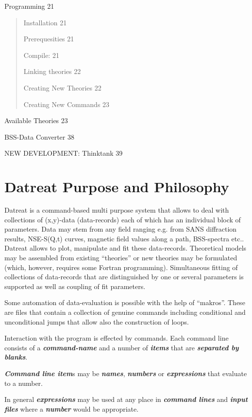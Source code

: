 \documentclass[]{article}
\begin{document}
Programming 21

\begin{quote}
Installation 21

Prerequesities 21

Compile: 21

Linking theories 22

Creating New Theories 22

Creating New Commands 23
\end{quote}

Available Theories 23

BSS-Data Converter 38

NEW DEVELOPMENT: Thinktank 39

\hypertarget{datreat-purpose-and-philosophy}{%
\section{Datreat Purpose and
Philosophy}\label{datreat-purpose-and-philosophy}}

Datreat is a command-based multi purpose system that allows to deal with
collections of (x,y)-data (data-records) each of which has an individual
block of parameters. Data may stem from any field ranging e.g. from SANS
diffraction results, NSE-S(Q,t) curves, magnetic field values along a
path, BSS-spectra etc.. Datreat allows to plot, manipulate and fit these
data-records. Theoretical models may be assembled from existing
``theories'' or new theories may be formulated (which, however, requires
some Fortran programming). Simultaneous fitting of collections of
data-records that are distinguished by one or several parameters is
supported as well as coupling of fit parameters.

Some automation of data-evaluation is possible with the help of
``makros''. These are files that contain a collection of genuine
commands including conditional and unconditional jumps that allow also
the construction of loops.

Interaction with the program is effected by commands. Each command line
consists of a \emph{\textbf{command-name}} and a number of
\emph{\textbf{items}} that are \emph{\textbf{separated by blanks}}.

\emph{\textbf{Command line item}}s may be \emph{\textbf{names}},
\emph{\textbf{numbers}} or \emph{\textbf{expressions}} that evaluate to
a number.

In general \emph{\textbf{expressions}} may be used at any place in
\emph{\textbf{command lines}} and \emph{\textbf{input files}} where a
\emph{\textbf{number}} would be appropriate.
\end{document}
